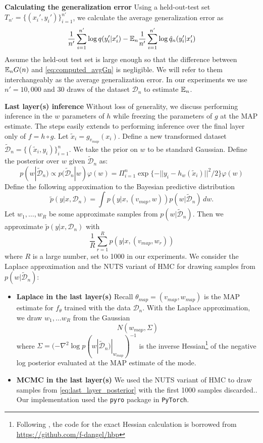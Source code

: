 \documentclass{article} %
\begin{document}
\textbf{Calculating the generalization error}
Using a held-out-test set $T_{n'} = \{(x_i',y_i')\}_{i=1}^{n'}$, we calculate the average generalization error as
\begin{equation}
\frac{1}{n'} \sum_{i=1}^{n'} \log q(y_i'|x_i') - {\mathbb{E}}_n \frac{1}{n'} \sum_{i=1}^{n'} \log \hat q_n(y_i'|x_i')
\label{eq:computed_avgGn}
\end{equation}
Assume the held-out test set is large enough so that the difference between ${\mathbb{E}}_n G(n)$ and \eqref{eq:computed_avgGn} is negligible. We will refer to them interchangeably as the average generalization error. In our experiments we use $n' = 10,000$ and $30$ draws of the dataset $\mathcal{D}_n$ to estimate ${\mathbb{E}}_n$.

\textbf{Last layer(s) inference}
Without loss of generality, we discuss performing inference in the $w$ parameters of $h$ while freezing the parameters of $g$ at the MAP estimate. The steps easily extends to performing inference over the final layer only of $f = h \circ g$. Let $\tilde x_i = g_{v_{map}}(x_i)$. Define a new transformed dataset $\tilde{\mathcal D}_n = \{(\tilde x_i, y_i) \}_{i=1}^n$. We take the prior on $w$ to be standard Gaussian. 
Define the posterior over $w$ given $\tilde{\mathcal D}_n$ as:
\begin{equation}
p(w | \tilde{\mathcal D}_n) \propto p(\tilde{\mathcal D}_n | w) \varphi(w) = \Pi_{i=1}^n \exp\{-|| y_i - h_w(\tilde x_i) ||^2/2\} \varphi(w)
\label{eq:last_layer_posterior}
\end{equation}
Define the following approximation to the Bayesian predictive distribution
$$
\tilde p(y|x, \mathcal D_n) = \int p(y|x,(v_{map},w)) p(w|\tilde{\mathcal D}_n) \,dw.
$$
Let $w_1,\ldots,w_R$ be some approximate samples from $p(w | \tilde{\mathcal D}_n)$. Then we approximate $\tilde p(y|x, \mathcal D_n)$ with
\[
\frac{1}{R} \sum_{r=1}^R p(y|x,(v_{map},w_r))
\]
where $R$ is a large number, set to 1000 in our experiments. We consider the Laplace approximation and the NUTS variant of HMC for drawing samples from $p(w | \tilde{\mathcal D}_n)$:

\begin{itemize}
	\item \textbf{Laplace in the last layer(s)}
	Recall $\theta_{map} = (v_{map}, w_{map})$ is the MAP estimate for $f_\theta$ trained with the data $\mathcal D_n$. With the Laplace approximation, we draw $w_1,\ldots w_R$ from the Gaussian
	\[
	N(w_{map}, \Sigma)
	\]
	where $\Sigma = (- \nabla^2 \log p(w| \tilde{\mathcal D}_n) |_{w_{map}})^{-1}$ is the inverse Hessian\footnote{Following \citet{kristiadi_being_2020}, the code for the exact Hessian calculation is borrowed from \url{https://github.com/f-dangel/hbp}} of the negative log posterior evaluated at the MAP estimate of the mode.
	\item \textbf{MCMC in the last layer(s)}
	We used the NUTS variant of HMC to draw samples from \eqref{eq:last_layer_posterior} with the first 1000 samples  discarded.. Our implementation used the \texttt{pyro} package in \texttt{PyTorch}.
	
\end{itemize}
\end{document}

